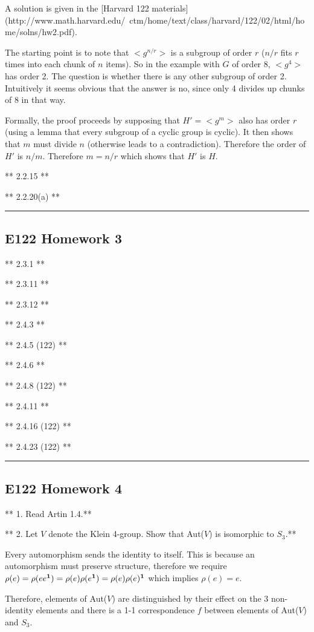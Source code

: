 A solution is given in the
[Harvard 122 materials](http://www.math.harvard.edu/~ctm/home/text/class/harvard/122/02/html/home/solns/hw2.pdf).

The starting point is to note that $<g^{n/r}>$ is a subgroup of order $r$
($n/r$ fits $r$ times into each chunk of $n$ items). So in the example with $G$
of order 8, $<g^{4}>$ has order 2. The question is whether there is any other
subgroup of order 2. Intuitively it seems obvious that the answer is no, since
only 4 divides up chunks of 8 in that way.

Formally, the proof proceeds by supposing that $H' = <g^m>$ also has order $r$
(using a lemma that every subgroup of a cyclic group is cyclic). It then shows
that $m$ must divide $n$ (otherwise leads to a contradiction). Therefore the
order of $H'$ is $n/m$. Therefore $m = n/r$ which shows that $H'$ is $H$.

** 2.2.15 **

** 2.2.20(a) **


\hrule

\subsection{E122 Homework 3}

** 2.3.1 **

** 2.3.11 **

** 2.3.12 **

** 2.4.3 **

** 2.4.5 (122) **

** 2.4.6 **

** 2.4.8 (122) **

** 2.4.11 **

** 2.4.16 (122) **

** 2.4.23 (122) **


\hrule
\subsection{E122 Homework 4}
** 1. Read Artin 1.4.**

** 2. Let $V$ denote the Klein 4-group. Show that Aut($V$) is isomorphic to $S_3$.**

Every automorphism sends the identity to itself. This is because an
automorphism must preserve structure, therefore we require $\rho(e) =
\rho(ee^{\mathbf 1}) = \rho(e)\rho(e^{\mathbf 1}) = \rho(e)\rho(e)^{\mathbf 1}$ which implies $\rho(e) =
e$.

Therefore, elements of Aut($V$) are distinguished by their effect on the 3
non-identity elements and there is a 1-1 correspondence $f$ between elements of
Aut($V$) and $S_3$.


